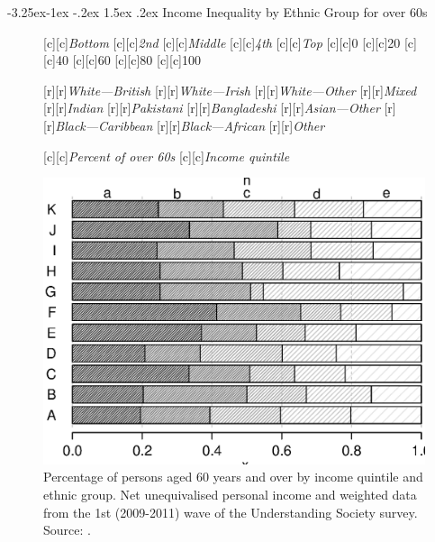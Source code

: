\documentclass[11 pt, a4paper]{report}
\makeatletter
\renewcommand\subsection{\@startsection{subsection}{2}{\z@}%
                                     {-3.25ex\@plus -1ex \@minus -.2ex}%
                                     {1.5ex \@plus .2ex}%
    								{\large\scshape}}
\makeatother
\begin{document}
\subsection{Income Inequality by Ethnic Group for over 60s}
\begin{figure}[hbtp!]
[c][c]{\small{\emph{Bottom}}}
[c][c]{\small{\emph{2nd}}}
[c][c]{\small{\emph{Middle}}}
[c][c]{\small{\emph{4th}}}
[c][c]{\small{\emph{Top}}}
[c][c]{\small{0}}
[c][c]{\small{20}}
[c][c]{\small{40}}
[c][c]{\small{60}}
[c][c]{\small{80}}
[c][c]{\small{100}}


[r][r]{\small{\emph{White---British}}}
[r][r]{\small{\emph{White---Irish}}}
[r][r]{\small{\emph{White---Other}}}
[r][r]{\small{\emph{Mixed}}}
[r][r]{\small{\emph{Indian}}}
[r][r]{\small{\emph{Pakistani}}}
[r][r]{\small{\emph{Bangladeshi}}}
[r][r]{\small{\emph{Asian---Other}}}
[r][r]{\small{\emph{Black---Caribbean}}}
[r][r]{\small{\emph{Black---African}}}
[r][r]{\small{\emph{Other}}}


[c][c]{\small{\emph{Percent of over 60s}}}
[c][c]{\small{\emph{Income quintile}}}

\includegraphics[width=\textwidth]{../figures/Fig8.12.eps}
\caption{Percentage of persons aged 60 years and over by income quintile and ethnic group. Net unequivalised personal income and weighted data from the 1st (2009-2011) wave of the Understanding Society  survey. Source: \citet{UoE2015}. }\label{Fig:US03} %
\end{figure}
\end{document}
